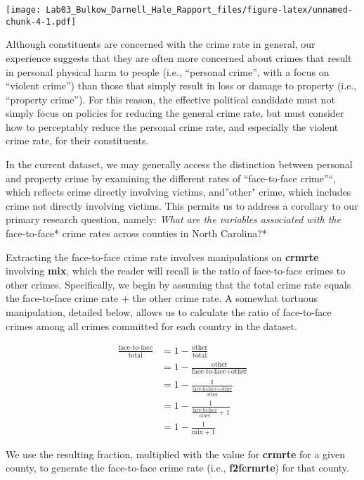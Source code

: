 \documentclass[]{article}
\begin{document}
\texttt{[image: Lab03\_Bulkow\_Darnell\_Hale\_Rapport\_files/figure-latex/unnamed-chunk-4-1.pdf]}

Although constituents are concerned with the crime rate in general, our
experience suggests that they are often more concerned about crimes that
result in personal physical harm to people (i.e., ``personal crime'',
with a focus on ``violent crime'') than those that simply result in loss
or damage to property (i.e., ``property crime''). For this reason, the
effective political candidate must not simply focus on policies for
reducing the general crime rate, but must consider how to perceptably
reduce the personal crime rate, and especially the violent crime rate,
for their constituents.

In the current dataset, we may generally access the distinction between
personal and property crime by examining the different rates of
``face-to-face crime''``, which reflects crime directly involving
victims, and''other" crime, which includes crime not directly involving
victims. This permits us to address a corollary to our primary research
question, namely: \emph{What are the variables associated with the
}face-to-face* crime rates across counties in North Carolina?*

Extracting the face-to-face crime rate involves manipulations on
\textbf{crmrte} involving \textbf{mix}, which the reader will recall is
the ratio of face-to-face crimes to other crimes. Specifically, we begin
by assuming that the total crime rate equals the face-to-face crime rate
\(+\) the other crime rate. A somewhat tortuous manipulation, detailed
below, allows us to calculate the ratio of face-to-face crimes among all
crimes committed for each country in the dataset.

\begin{align}
\frac{\text{face-to-face}}{\text{total}} &= 1 - \frac{\text{other}}{\text{total}} \\
&= 1 - \frac{\text{other}}{\text{face-to-face}+\text{other}} \\
&= 1 - \frac{1}{\frac{\text{face-to-face}+\text{other}}{\text{other}}}\\
&= 1 - \frac{1}{\frac{\text{face-to-face}}{\text{other}}+1}\\
&= 1 - \frac{1}{\text{mix}+1}
\end{align}

We use the resulting fraction, multiplied with the value for
\textbf{crmrte} for a given county, to generate the face-to-face crime
rate (i.e., \textbf{f2fcrmrte}) for that county.
\end{document}
